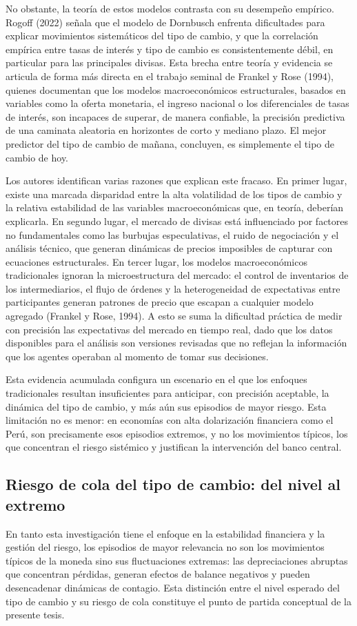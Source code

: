 ﻿\documentclass[11pt,a4paper]{article}
\begin{document}
No obstante, la teoría de estos modelos contrasta con su desempeño empírico. Rogoff (2022) señala que el modelo de Dornbusch enfrenta dificultades para explicar movimientos sistemáticos del tipo de cambio, y que la correlación empírica entre tasas de interés y tipo de cambio es consistentemente débil, en particular para las principales divisas. Esta brecha entre teoría y evidencia se articula de forma más directa en el trabajo seminal de Frankel y Rose (1994), quienes documentan que los modelos macroeconómicos estructurales, basados en variables como la oferta monetaria, el ingreso nacional o los diferenciales de tasas de interés, son incapaces de superar, de manera confiable, la precisión predictiva de una caminata aleatoria en horizontes de corto y mediano plazo. El mejor predictor del tipo de cambio de mañana, concluyen, es simplemente el tipo de cambio de hoy.


Los autores identifican varias razones que explican este fracaso. En primer lugar, existe una marcada disparidad entre la alta volatilidad de los tipos de cambio y la relativa estabilidad de las variables macroeconómicas que, en teoría, deberían explicarla. En segundo lugar, el mercado de divisas está influenciado por factores no fundamentales como las burbujas especulativas, el ruido de negociación y el análisis técnico, que generan dinámicas de precios imposibles de capturar con ecuaciones estructurales. En tercer lugar, los modelos macroeconómicos tradicionales ignoran la microestructura del mercado: el control de inventarios de los intermediarios, el flujo de órdenes y la heterogeneidad de expectativas entre participantes generan patrones de precio que escapan a cualquier modelo agregado (Frankel y Rose, 1994). A esto se suma la dificultad práctica de medir con precisión las expectativas del mercado en tiempo real, dado que los datos disponibles para el análisis son versiones revisadas que no reflejan la información que los agentes operaban al momento de tomar sus decisiones.

Esta evidencia acumulada configura un escenario en el que los enfoques tradicionales resultan insuficientes para anticipar, con precisión aceptable, la dinámica del tipo de cambio, y más aún sus episodios de mayor riesgo. Esta limitación no es menor: en economías con alta dolarización financiera como el Perú, son precisamente esos episodios extremos, y no los movimientos típicos, los que concentran el riesgo sistémico y justifican la intervención del banco central.


\subsection{Riesgo de cola del tipo de cambio: del nivel al extremo}
En tanto esta investigación tiene el enfoque en la estabilidad financiera y la gestión del riesgo, los episodios de mayor relevancia no son los movimientos típicos de la moneda sino sus fluctuaciones extremas: las depreciaciones abruptas que concentran pérdidas, generan efectos de balance negativos y pueden desencadenar dinámicas de contagio. Esta distinción entre el nivel esperado del tipo de cambio y su riesgo de cola constituye el punto de partida conceptual de la presente tesis.
\end{document}
